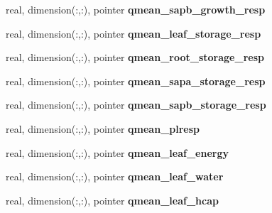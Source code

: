 \begin{DoxyCompactItemize}
\item 
\hypertarget{structed__state__vars_1_1patchtype_a364187d8b442535d936940988c313d50}{
real, dimension(:,:), pointer {\bfseries qmean\_\-sapb\_\-growth\_\-resp}}
\label{structed__state__vars_1_1patchtype_a364187d8b442535d936940988c313d50}

\item 
\hypertarget{structed__state__vars_1_1patchtype_af787d5519e09fca69e3fe4b01bacbcf3}{
real, dimension(:,:), pointer {\bfseries qmean\_\-leaf\_\-storage\_\-resp}}
\label{structed__state__vars_1_1patchtype_af787d5519e09fca69e3fe4b01bacbcf3}

\item 
\hypertarget{structed__state__vars_1_1patchtype_ad8f1b6d5f4c8db484f2df0c65d8877d2}{
real, dimension(:,:), pointer {\bfseries qmean\_\-root\_\-storage\_\-resp}}
\label{structed__state__vars_1_1patchtype_ad8f1b6d5f4c8db484f2df0c65d8877d2}

\item 
\hypertarget{structed__state__vars_1_1patchtype_a17db1b63978c30f65ba0b5d4ab90b2db}{
real, dimension(:,:), pointer {\bfseries qmean\_\-sapa\_\-storage\_\-resp}}
\label{structed__state__vars_1_1patchtype_a17db1b63978c30f65ba0b5d4ab90b2db}

\item 
\hypertarget{structed__state__vars_1_1patchtype_aab712f9a283d73d3c50f82573ed64142}{
real, dimension(:,:), pointer {\bfseries qmean\_\-sapb\_\-storage\_\-resp}}
\label{structed__state__vars_1_1patchtype_aab712f9a283d73d3c50f82573ed64142}

\item 
\hypertarget{structed__state__vars_1_1patchtype_a084780b2b9276719b05de4daf4d8bcb0}{
real, dimension(:,:), pointer {\bfseries qmean\_\-plresp}}
\label{structed__state__vars_1_1patchtype_a084780b2b9276719b05de4daf4d8bcb0}

\item 
\hypertarget{structed__state__vars_1_1patchtype_a90eb3b39cfa870d8489216f270d9f6b9}{
real, dimension(:,:), pointer {\bfseries qmean\_\-leaf\_\-energy}}
\label{structed__state__vars_1_1patchtype_a90eb3b39cfa870d8489216f270d9f6b9}

\item 
\hypertarget{structed__state__vars_1_1patchtype_a1620d3546977d1c380966050bb3bdd60}{
real, dimension(:,:), pointer {\bfseries qmean\_\-leaf\_\-water}}
\label{structed__state__vars_1_1patchtype_a1620d3546977d1c380966050bb3bdd60}

\item 
\hypertarget{structed__state__vars_1_1patchtype_a1b75faa21f1eb066a1f5f8d2b830cef1}{
real, dimension(:,:), pointer {\bfseries qmean\_\-leaf\_\-hcap}}
\label{structed__state__vars_1_1patchtype_a1b75faa21f1eb066a1f5f8d2b830cef1}


\end{DoxyCompactItemize}
